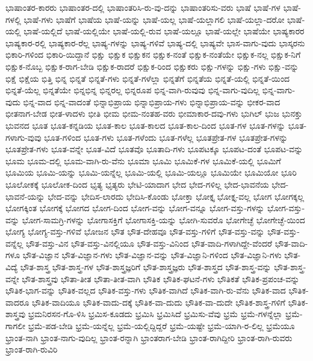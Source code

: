 {ಭಾಷಾಂತರ-ಕಾರರು
ಭಾಷಾಂತರ-ದಲ್ಲಿ
ಭಾಷಾಂತರಿಸಿ-ರು-ವು-ದನ್ನು
ಭಾಷಾಂತರಿಸು-ವರು
ಭಾಷೆ
ಭಾಷೆ-ಗಳ
ಭಾಷೆ-ಗಳಲ್ಲಿ
ಭಾಷೆ-ಗಳು
ಭಾಷೆಗೆ
ಭಾಷೆಯ
ಭಾಷೆ-ಯನ್ನು
ಭಾಷೆ-ಯಲ್ಲ
ಭಾಷೆ-ಯಲ್ಲಾಗಲಿ
ಭಾಷೆ-ಯಲ್ಲಾ-ದರೋ
ಭಾಷೆ-ಯಲ್ಲಿ
ಭಾಷೆ-ಯಲ್ಲಿದೆ
ಭಾಷೆ-ಯಲ್ಲಿಯೇ
ಭಾಷೆ-ಯಲ್ಲಿ-ರುವ
ಭಾಷೆ-ಯಲ್ಲೂ
ಭಾಷೆ-ಯಲ್ಲೇ
ಭಾಷೆಯೇ
ಭಾಷ್ಯಕಾರರ
ಭಾಷ್ಯಕಾರ-ರಲ್ಲಿ
ಭಾಷ್ಯಕಾರ-ರೆಲ್ಲ
ಭಾಷ್ಯ-ಗಳನ್ನು
ಭಾಷ್ಯ-ಗಳಿವೆ
ಭಾಷ್ಯ-ದಲ್ಲಿ
ಭಾಷ್ಯವೇ
ಭಾಸ-ವಾಗು-ವುದು
ಭಾಸ್ಕರನು
ಭಿಕಾರಿ-ಗಳಿಂದ
ಭಿಕಾರಿ-ಯಿದ್ದಾನೆ
ಭಿಕ್ಷು
ಭಿಕ್ಷುಕ
ಭಿಕ್ಷುಕನ
ಭಿಕ್ಷುಕ-ನಂತೆ
ಭಿಕ್ಷುಕ-ನಂತೆಯೇ
ಭಿಕ್ಷುಕ-ನಲ್ಲ
ಭಿಕ್ಷುಕ-ನಿಗೆ
ಭಿಕ್ಷುಕ-ನೊಬ್ಬ
ಭಿಕ್ಷುಕ-ರಾಗ-ಬೇಡಿ
ಭಿಕ್ಷುಕ-ರಾದರೆ
ಭಿಕ್ಷುಕ-ರಿಂದ
ಭಿಕ್ಷುಕರು
ಭಿಕ್ಷು-ಗಳನ್ನು
ಭಿಕ್ಷು-ಗಳು
ಭಿಕ್ಷು-ವನ್ನು
ಭಿಕ್ಷೆ
ಭಿಕ್ಷೆಯ
ಭಿತ್ತಿ
ಭಿನ್ನ
ಭಿನ್ನತೆ
ಭಿನ್ನತೆ-ಗಳು
ಭಿನ್ನತೆ-ಗಳೆಲ್ಲಾ
ಭಿನ್ನತೆಗೆ
ಭಿನ್ನತೆಯ
ಭಿನ್ನತೆ-ಯಲ್ಲಿ
ಭಿನ್ನತೆ-ಯಿಂದ
ಭಿನ್ನತೆ-ಯೆಲ್ಲ
ಭಿನ್ನತೆಯೇ
ಭಿನ್ನಭಿನ್ನ
ಭಿನ್ನರಲ್ಲ
ಭಿನ್ನರೂಪ
ಭಿನ್ನ-ವಾಗಿ-ರುವುವು
ಭಿನ್ನ-ವಾಗು-ವುದಿಲ್ಲ
ಭಿನ್ನ-ವಾಗು-ವುದು
ಭಿನ್ನ-ವಾದ
ಭಿನ್ನ-ವಾದಂತೆ
ಭಿನ್ನಾಭಿಪ್ರಾಯ
ಭಿನ್ನಾಭಿಪ್ರಾಯ-ಗಳು
ಭಿನ್ನಾಭಿಪ್ರಾಯ-ವನ್ನು
ಭೀಕರ-ವಾದ
ಭೀತನಾಗ-ಬೇಡ
ಭೀತ-ಳಾದಳು
ಭೀತಿ
ಭೀಮ
ಭೀಮ-ನಂತಹ-ವರು
ಭೀಮಾಕಾರ-ದವು-ಗಳು
ಭುಗಿಲ್
ಭುಜ
ಭುನಕ್ತು
ಭುವನದ
ಭೂತ
ಭೂತ-ಕನ್ನಡಿಯ
ಭೂತ-ಕಾಲ
ಭೂತ-ಕಾಲದ
ಭೂತ-ಕಾಲ-ದಿಂದ
ಭೂತ-ಗಳ
ಭೂತ-ಗಳನ್ನು
ಭೂತ-ಗಳಾಗು-ವುವು
ಭೂತ-ಗಳಿಂದ
ಭೂತ-ಗಳು
ಭೂತ-ಗಳೆಂದು
ಭೂತ-ಗಳೆಲ್ಲ
ಭೂತಪ್ರೇತ-ಗಳ
ಭೂತಪ್ರೇತ-ಗಳನ್ನು
ಭೂತಪ್ರೇತ-ಗಳು
ಭೂತ-ವನ್ನೇ
ಭೂತ-ವಿದೆ
ಭೂತವೊ
ಭೂತಾದಿ-ಗಳು
ಭೂಪಟಕ್ಕೂ
ಭೂಪಟ-ದಂತೆ
ಭೂಪಟ-ವನ್ನು
ಭೂಮ
ಭೂಮ-ದಲ್ಲಿ
ಭೂಮ-ವಾಗಿ-ರು-ವೆನು
ಭೂಮಾ
ಭೂಮಿ
ಭೂಮಿಕೆ-ಗಳ
ಭೂಮಿಕೆ-ಯಲ್ಲಿ
ಭೂಮಿಗೆ
ಭೂಮಿಯ
ಭೂಮಿ-ಯನ್ನು
ಭೂಮಿ-ಯನ್ನೆಲ್ಲ
ಭೂಮಿ-ಯಲ್ಲಿ
ಭೂಮಿ-ಯಲ್ಲೂ
ಭೂಮಿಯೇ
ಭೂಮಿಯೋ
ಭೂರಿ
ಭೂಲೋಕಕ್ಕೆ
ಭೂಲೋಕ-ದಿಂದ
ಭೃತ್ಯ
ಭೃತ್ಯರು
ಭೇಟಿ-ಯಾದಾಗ
ಭೇದ
ಭೇದ-ಗಳಿಲ್ಲ
ಭೇದ-ಭಾವನೆಯ
ಭೇದ-ಭಾವನೆ-ಯನ್ನು
ಭೇದ-ವನ್ನು
ಭೇದಿಸ-ಲಾರದು
ಭೇದಿಸಿ-ಕೊಂಡು
ಭೋಕ್ತಾ
ಭೋಕ್ತೃ
ಭೋಕ್ತೃ-ವಲ್ಲ
ಭೋಗ
ಭೋಗಕ್ಕಲ್ಲ
ಭೋಗಕ್ಕಿಂತ
ಭೋಗಕ್ಕೆ
ಭೋಗದ
ಭೋಗ-ದಿಂದ
ಭೋಗ-ವನ್ನು
ಭೋಗ-ವನ್ನೂ
ಭೋಗ-ವಸ್ತು-ಗಳನ್ನು
ಭೋಗ-ವಸ್ತು-ವನ್ನು
ಭೋಗ-ಸಾಮಗ್ರಿ-ಗಳನ್ನು
ಭೋಗಾಸಕ್ತಿಗೆ
ಭೋಗಾಸಕ್ತಿ-ಯನ್ನು
ಭೋಗಿ-ಸುವರೊ
ಭೋಗೇಚ್ಛೆ
ಭೋಗೇಚ್ಛೆ-ಯಿಂದ
ಭೋಗ್ಯ
ಭೋಗ್ಯ-ವಸ್ತು-ಗಳಿವೆ
ಭೋಜನ
ಭೌತ
ಭೌತ-ದೇಹವೂ
ಭೌತ-ವಸ್ತು-ಗಳಿಗೆ
ಭೌತ-ವಸ್ತು-ವನ್ನು
ಭೌತ-ವಸ್ತು-ವನ್ನೆಲ್ಲ
ಭೌತ-ವಸ್ತು-ವಿನ
ಭೌತ-ವಸ್ತು-ವಿನಲ್ಲಿಯೂ
ಭೌತ-ವಸ್ತು-ವಿನಿಂದ
ಭೌತ-ವಾದಿ-ಗಳಾಗಿದ್ದೇ-ವೆಂದರೆ
ಭೌತ-ವಾದಿ-ಗಳೂ
ಭೌತ-ವಿಜ್ಞಾನ
ಭೌತ-ವಿಜ್ಞಾನ-ಗಳು
ಭೌತ-ವಿಜ್ಞಾನ-ವನ್ನು
ಭೌತ-ವಿಜ್ಞಾನಿ-ಗಳಿಂದ
ಭೌತ-ವಿಜ್ಞಾನಿ-ಗಳು
ಭೌತ-ವಿದ್ಯೆ
ಭೌತ-ಶಾಸ್ತ್ರ
ಭೌತ-ಶಾಸ್ತ್ರ-ಗಳ
ಭೌತ-ಶಾಸ್ತ್ರಜ್ಞರಿಗೆ
ಭೌತ-ಶಾಸ್ತ್ರಜ್ಞರು
ಭೌತ-ಶಾಸ್ತ್ರದ
ಭೌತ-ಶಾಸ್ತ್ರ-ವನ್ನು
ಭೌತ-ಶಾಸ್ತ್ರ-ವನ್ನೇ
ಭೌತ-ಶಾಸ್ತ್ರವು
ಭೌತಾ-ತೀತ
ಭೌತಾ-ತೀತ-ವಾಗಿ
ಭೌತಿಕ
ಭೌತಿಕ-ಘಟನೆ-ಗಳು
ಭೌತಿಕತೆ
ಭೌತಿಕ-ಪ್ರಪಂಚ-ವನ್ನು
ಭೌತಿಕ-ಭಾಗ-ವನ್ನು
ಭೌತಿಕ-ವಲ್ಲದ
ಭೌತಿಕ-ವಸ್ತು-ಗಳು
ಭೌತಿಕ-ವಾಗಿದೆ
ಭೌತಿಕ-ವಾಗಿ-ರು-ವೆನು
ಭೌತಿಕ-ವಾದ
ಭೌತಿಕ-ವಾದರೂ
ಭೌತಿಕ-ವಾದಿಯೂ
ಭೌತಿಕ-ವಾದು-ದಕ್ಕೆ
ಭೌತಿಕ-ವಾ-ದುದು
ಭೌತಿಕ-ವಾ-ದುದೇ
ಭೌತಿಕ-ಶಾಸ್ತ್ರ-ಗಳಿಗೆ
ಭೌತಿಕ-ಶಾಸ್ತ್ರವು
ಭ್ರಮನಿರಸನ-ಗೊ-ಳಿಸಿ
ಭ್ರಮಿಸ-ಕೂಡದು
ಭ್ರಮಿಸಿ
ಭ್ರಮಿಸಿದೆ
ಭ್ರಮಿಸು-ವೆವು
ಭ್ರಮೆ
ಭ್ರಮೆ-ಗಳನ್ನೆಲ್ಲಾ
ಭ್ರಮೆ-ಗಾಗಲೀ
ಭ್ರಮೆ-ಪಡ-ಬೇಡಿ
ಭ್ರಮೆ-ಯನ್ನೆಲ್ಲ
ಭ್ರಮೆ-ಯಲ್ಲಿದ್ದಿದ್ದರೆ
ಭ್ರಮೆ-ಯಷ್ಟೇ
ಭ್ರಮೆ-ಯಾಗಿ-ರ-ಲಿಲ್ಲ
ಭ್ರಮೆಯೂ
ಭ್ರಾಂತ-ನಾಗಿ
ಭ್ರಾಂತ-ನಾಗು-ವುದಿಲ್ಲ
ಭ್ರಾಂತ-ರನ್ನಾಗಿ
ಭ್ರಾಂತರಾಗ-ಬೇಡಿ
ಭ್ರಾಂತ-ರಾಗಿದ್ದೀರಿ
ಭ್ರಾಂತ-ರಾಗಿ-ರುವರು
ಭ್ರಾಂತ-ರಾಗಿ-ರುವಿರಿ
}
